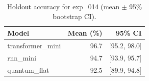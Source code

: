 \begin{table}[ht]
\centering
\caption{Holdout accuracy for exp_014 (mean $\pm$ 95\% bootstrap CI).}
\label{tab:exp_014}
\begin{tabular}{lrr}
\toprule
Model & Mean (\%) & 95\% CI \\
\midrule
transformer\_mini & 96.7 & [95.2, 98.0] \\
rnn\_mini & 94.7 & [93.9, 95.7] \\
quantum\_flat & 92.5 & [89.9, 94.8] \\
\bottomrule
\end{tabular}
\end{table}
